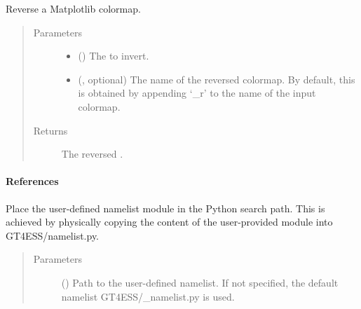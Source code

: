 \documentclass[letterpaper,10pt,english]{sphinxmanual}
\begin{document}
\begin{fulllineitems}
\label{\detokenize{api:utils.reverse_colormap}}
Reverse a Matplotlib colormap.
\begin{quote}\begin{description}
\item[{Parameters}] \leavevmode\begin{itemize}
\item {} 
 () \textendash{} The  to invert.

\item {} 
 (, optional) \textendash{} The name of the reversed colormap. By default, this is obtained by
appending ‘\_r’ to the name of the input colormap.

\end{itemize}

\item[{Returns}] \leavevmode
The reversed .

\end{description}\end{quote}
\paragraph{References}


\end{fulllineitems}


\begin{fulllineitems}
\label{\detokenize{api:utils.set_namelist}}
Place the user-defined namelist module in the Python search path.
This is achieved by physically copying the content of the user-provided
module into GT4ESS/namelist.py.
\begin{quote}\begin{description}
\item[{Parameters}] \leavevmode
{} () \textendash{} Path to the user-defined namelist. If not specified,
the default namelist GT4ESS/\_namelist.py is used.

\end{description}\end{quote}

\end{fulllineitems}
\end{document}
